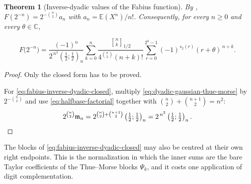 \documentclass[11pt,oneside,openany]{book}
\newtheorem{theorem}{Theorem}[chapter]
\theoremstyle{definition}
\theoremstyle{remark}
\newcommand{\Qbinom}[3]{\genfrac{[}{]}{0pt}{}{#1}{#2}_{#3}}
\newcommand{\C}{\mathbb C}
\begin{document}
\begin{theorem}[Inverse-dyadic values of the Fabius function]\label{thm:fabius-inverse-dyadic}
By , $F(2^{-n})=2^{-\binom n2}a_n$ with
$a_n=\mathbb E(X^n)/n!$.  Consequently, for every $n\ge0$ and every
$\theta\in\C$,

\begin{equation}\label{eq:fabius-inverse-dyadic-closed}
 \boxed{\;
 F\bigl(2^{-n}\bigr)
 =\frac{(-1)^n}{2^{\,n^2}\left(\frac12;\frac12\right)_n}
 \sum_{k=0}^{n}
 \frac{\Qbinom nk{1/2}}{4^{\binom k2}(n+k)!}
 \sum_{r=0}^{2^k-1}(-1)^{s_2(r)}(r+\theta)^{\,n+k}.\;}
\end{equation}
\end{theorem}

\begin{proof}
Only the closed form has to be proved.

For \eqref{eq:fabius-inverse-dyadic-closed}, multiply \eqref{eq:dyadic-gaussian-thue-morse} by $2^{-\binom n2}$ and use \eqref{eq:halfbase-factorial} together with $\binom n2+\binom{n+1}{2}=n^2$:
\[
 2^{\binom n2}\mathfrak m_n
 =2^{\binom n2+\binom{n+1}{2}}\left(\tfrac12;\tfrac12\right)_n
 =2^{\,n^2}\left(\tfrac12;\tfrac12\right)_n . \qedhere
\]
\end{proof}

The blocks of \eqref{eq:fabius-inverse-dyadic-closed} may also be centred at their own right endpoints.  This is the normalization in which the inner sums are the bare Taylor coefficients of the Thue--Morse blocks $\Psi_k$, and it costs one application of digit complementation.
\end{document}
